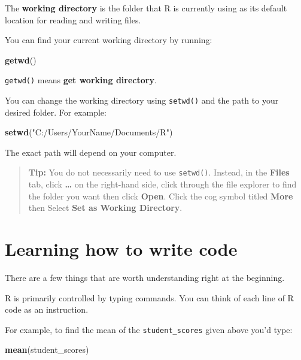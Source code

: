 \documentclass[
]{book}
\newenvironment{Shaded}{\begin{snugshade}}{\end{snugshade}}
\newcommand{\FunctionTok}[1]{\textcolor[rgb]{0.13,0.29,0.53}{\textbf{#1}}}
\newcommand{\NormalTok}[1]{#1}
\newcommand{\StringTok}[1]{\textcolor[rgb]{0.31,0.60,0.02}{#1}}
\begin{document}
The \textbf{working directory} is the folder that R is currently using as its default location for reading and writing files.

You can find your current working directory by running:

\begin{Shaded}
\begin{Highlighting}[]
\FunctionTok{getwd}\NormalTok{()}
\end{Highlighting}
\end{Shaded}

\texttt{getwd()} means \textbf{get working directory}.

You can change the working directory using \texttt{setwd()} and the path to your desired folder. For example:

\begin{Shaded}
\begin{Highlighting}[]
\FunctionTok{setwd}\NormalTok{(}\StringTok{"C:/Users/YourName/Documents/R"}\NormalTok{)}
\end{Highlighting}
\end{Shaded}

The exact path will depend on your computer.

\begin{quote}
\textbf{Tip:} You do not necessarily need to use \texttt{setwd()}. Instead, in the \textbf{Files} tab, click \textbf{\ldots{}} on the right-hand side, click through the file explorer to find the folder you want then click \textbf{Open}. Click the cog symbol titled \textbf{More} then Select \textbf{Set as Working Directory}.
\end{quote}

\section{Learning how to write code}\label{learning-how-to-write-code}

There are a few things that are worth understanding right at the beginning.

R is primarily controlled by typing commands. You can think of each line of R code as an instruction.

For example, to find the mean of the \texttt{student\_scores} given above you'd type:

\begin{Shaded}
\begin{Highlighting}[]
\FunctionTok{mean}\NormalTok{(student\_scores)}
\end{Highlighting}
\end{Shaded}
\end{document}
